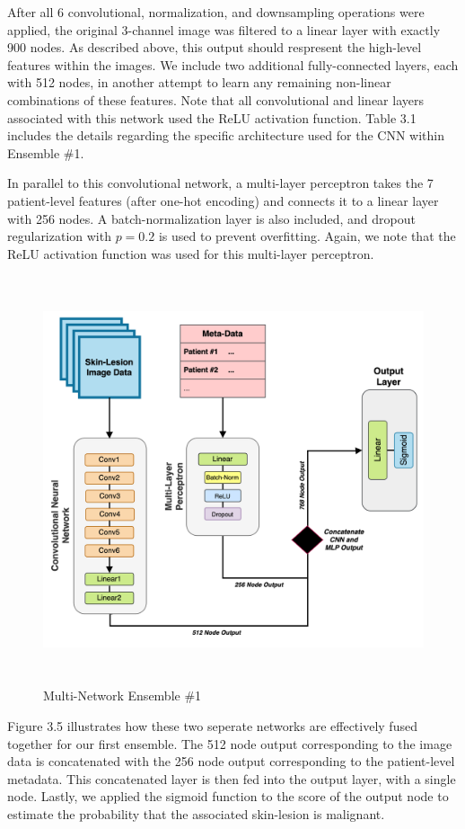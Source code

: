 \documentclass [MAS] {uclathes}
\begin{document}
After all 6 convolutional, normalization, and downsampling operations were applied, the original 3-channel image was filtered to a linear layer with exactly 900 nodes. As described above, this output should respresent the high-level features within the images. We include two additional fully-connected layers, each with 512 nodes, in another attempt to learn any remaining non-linear combinations of these features. Note that all convolutional and linear layers associated with this network used the ReLU activation function. Table 3.1 includes the details regarding the specific architecture used for the CNN within Ensemble \#1.

In parallel to this convolutional network, a multi-layer perceptron takes the 7 patient-level features (after one-hot encoding) and connects it to a linear layer with 256 nodes. A batch-normalization layer is also included, and dropout regularization with $p=0.2$ is used to prevent overfitting. Again, we note that the ReLU activation function was used for this multi-layer perceptron. 

\begin{figure}[h]
\centering
\includegraphics[height = 120mm, width= 140mm]{imgs/ens1_arch.png}
\caption{Multi-Network Ensemble \#1}
\label{fig:ens1_arch}
\end{figure}

Figure 3.5 illustrates how these two seperate networks are effectively fused together for our first ensemble. The 512 node output corresponding to the image data is concatenated with the 256 node output corresponding to the patient-level metadata. This concatenated layer is then fed into the output layer, with a single node. Lastly, we applied the sigmoid function to the score of the output node to estimate the probability that the associated skin-lesion is malignant. 
\end{document}

